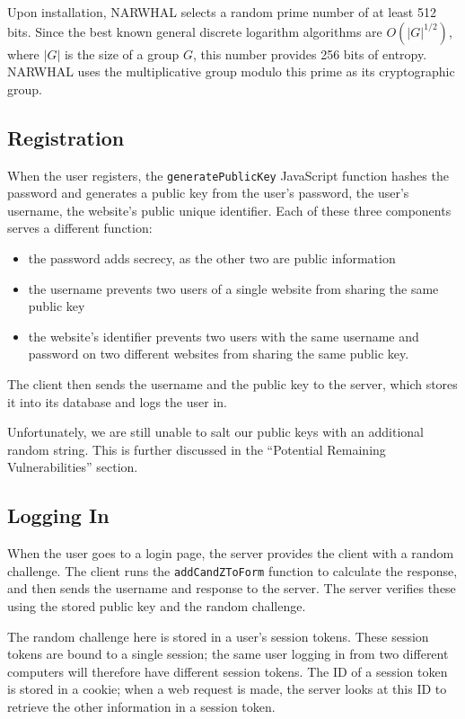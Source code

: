 \documentclass[11pt]{article}
\begin{document}
Upon installation, NARWHAL selects a random prime number of at least 512 bits.  Since the best known general discrete logarithm algorithms are $O(|G|^{1/2})$, where $|G|$ is the size of a group $G$, this number provides 256 bits of entropy.  NARWHAL uses the multiplicative group modulo this prime as its cryptographic group.

\subsection{Registration}

When the user registers, the \texttt{generatePublicKey} JavaScript function hashes the password and generates a public key from the user’s password, the user’s username, the website’s public unique identifier. Each of these three components serves a different function:
\begin{itemize}
  \item the password adds secrecy, as the other two are public information
  \item the username prevents two users of a single website from sharing the same public key
  \item the website’s identifier prevents two users with the same username and password on two different websites from sharing the same public key.
\end{itemize}

The client then sends the username and the public key to the server, which stores it into its database and logs the user in.

Unfortunately, we are still unable to salt our public keys with an additional random string. This is further discussed in the “Potential Remaining Vulnerabilities” section.

\subsection{Logging In}

When the user goes to a login page, the server provides the client with a random challenge. The client runs the \texttt{addCandZToForm} function to calculate the response, and then sends the username and response to the server. The server verifies these using the stored public key and the random challenge.

The random challenge here is stored in a user’s session tokens. These session tokens are bound to a single session; the same user logging in from two different computers will therefore have different session tokens. The ID of a session token is stored in a cookie; when a web request is made, the server looks at this ID to retrieve the other information in a session token.
\end{document}
